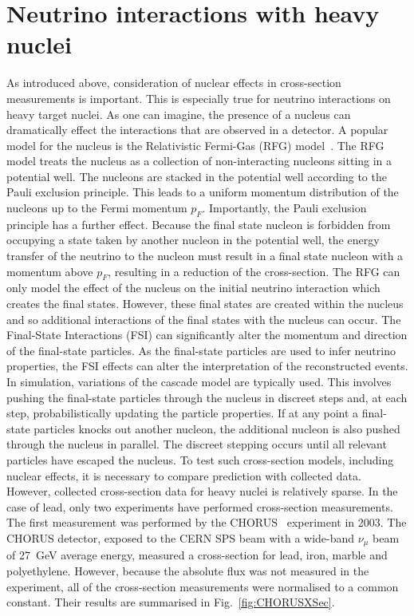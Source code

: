 \section{Neutrino interactions with heavy nuclei}
\label{sec:NeutrinoInteractionsHeavyNuclei}
As introduced above, consideration of nuclear effects in cross-section measurements is important.  This is especially true for neutrino interactions on heavy target nuclei.  As one can imagine, the presence of a nucleus can dramatically effect the interactions that are observed in a detector.  A popular model for the nucleus is the Relativistic Fermi-Gas (RFG) model~\cite{Smith:1972xh}.  The RFG model treats the nucleus as a collection of non-interacting nucleons sitting in a potential well.  The nucleons are stacked in the potential well according to the Pauli exclusion principle.  This leads to a uniform momentum distribution of the nucleons up to the Fermi momentum $p_F$.  Importantly, the Pauli exclusion principle has a further effect.  Because the final state nucleon is forbidden from occupying a state taken by another nucleon in the potential well, the energy transfer of the neutrino to the nucleon must result in a final state nucleon with a momentum above $p_F$, resulting in a reduction of the cross-section.
\newline
\newline
The RFG can only model the effect of the nucleus on the initial neutrino interaction which creates the final states.  However, these final states are created within the nucleus and so additional interactions of the final states with the nucleus can occur.  The Final-State Interactions (FSI) can significantly alter the momentum and direction of the final-state particles.  As the final-state particles are used to infer neutrino properties, the FSI effects can alter the interpretation of the reconstructed events.  In simulation, variations of the cascade model are typically used.  This involves pushing the final-state particles through the nucleus in discreet steps and, at each step, probabilistically updating the particle properties.  If at any point a final-state particles knocks out another nucleon, the additional nucleon is also pushed through the nucleus in parallel.  The discreet stepping occurs until all relevant particles have escaped the nucleus.
\newline
\newline
To test such cross-section models, including nuclear effects, it is necessary to compare prediction with collected data.  However, collected cross-section data for heavy nuclei is relatively sparse.  In the case of lead, only two experiments have performed cross-section measurements.  The first measurement was performed by the CHORUS~\cite{CHORUS_XSEC} experiment in 2003.  The CHORUS detector, exposed to the CERN SPS beam with a wide-band $\nu_\mu$ beam of 27~GeV average energy, measured a cross-section for lead, iron, marble and polyethylene.  However, because the absolute flux was not measured in the experiment, all of the cross-section measurements were normalised to a common constant.  Their results are summarised in Fig.~\ref{fig:CHORUSXSec}.
